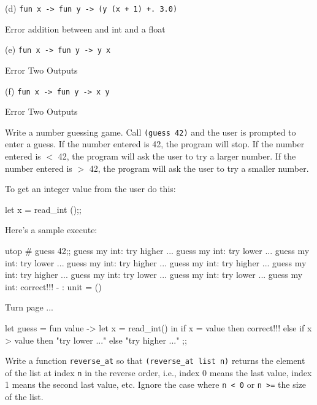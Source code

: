 (d) \verb!fun x -> fun y -> (y (x + 1) +. 3.0)!
\\
\ANSWER
\begin{answercode}
Error addition between and int and a float
\end{answercode}

(e) \verb!fun x -> fun y -> y x!
\\
\ANSWER
\begin{answercode}
Error Two Outputs
\end{answercode}

(f) \verb!fun x -> fun y -> x y!
\\
\ANSWER
\begin{answercode}
	Error Two Outputs
\end{answercode}

\newpage
\nextq
Write a number guessing game. Call \verb!(guess 42)!
and the user is prompted to enter a guess. If the number
entered is 42, the program will stop. If the number entered is
$<$ 42, the program will ask the user to try a larger number. If
the number entered is $>$ 42, the program will ask the user to
try a smaller number.

To get an integer value from the user do this:
\begin{console}
let x = read_int ();;
\end{console}

Here's a sample execute:
{\small
\begin{console}[commandchars=\\\{\}]
utop # guess 42;;
guess my int: 
try higher ...
guess my int: 
try lower ...
guess my int: 
try lower ...
guess my int: 
try higher ...
guess my int: 
try higher ...
guess my int: 
try higher ...
guess my int: 
try lower ...
guess my int: 
try lower ...
guess my int: 
correct!!!
- : unit = ()
\end{console}
}

Turn page ...
\newpage
\ANSWER
\begin{answercode}
let guess = fun value ->
	let x = read_int() in
	if x = value then
		correct!!!
	else if x > value then
		"try lower ..."
	else 
		"try higher ..."
;;	
\end{answercode}

\newpage
\nextq
Write a function \verb!reverse_at! so that \verb!(reverse_at list n)!
returns the element of the list at index \verb!n! in the reverse order,
i.e., index 0 means the last value, index 1 means the second last value, etc.
Ignore the case where \verb!n < 0! or \verb!n >=! the size of the list.

